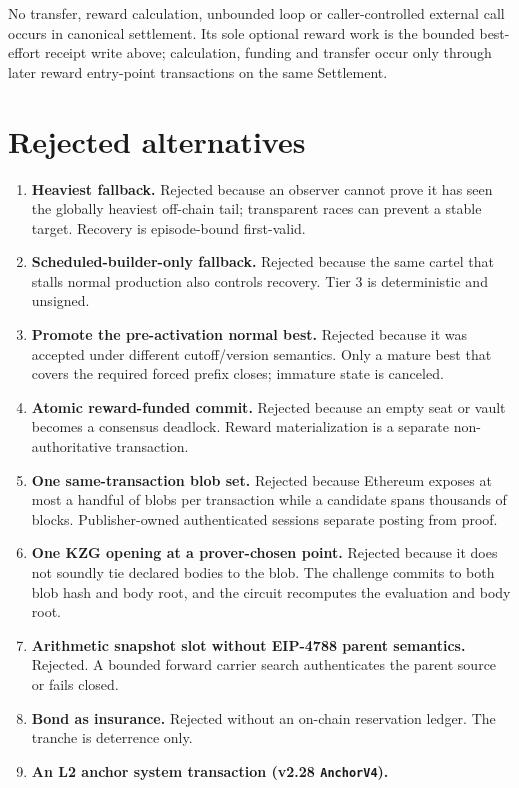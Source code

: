 \documentclass[a4paper,11pt]{article}
\newcommand{\code}[1]{\nolinkurl{#1}}
\begin{document}
No transfer, reward calculation, unbounded loop or caller-controlled external
call occurs in canonical settlement.  Its sole optional reward work is the
bounded best-effort receipt write above; calculation, funding and transfer occur
only through later reward entry-point transactions on the same Settlement.
\section{Rejected alternatives}\label{app:alternatives}

\begin{enumerate}
\item \textbf{Heaviest fallback.} Rejected because an observer cannot prove it
has seen the globally heaviest off-chain tail; transparent races can prevent a
stable target.  Recovery is episode-bound first-valid.
\item \textbf{Scheduled-builder-only fallback.} Rejected because the same cartel
that stalls normal production also controls recovery.  Tier 3 is deterministic
and unsigned.
\item \textbf{Promote the pre-activation normal best.} Rejected because it was
accepted under different cutoff/version semantics.  Only a mature best that
covers the required forced prefix closes; immature state is canceled.
\item \textbf{Atomic reward-funded commit.} Rejected because an empty seat or
vault becomes a consensus deadlock.  Reward materialization is a separate
non-authoritative transaction.
\item \textbf{One same-transaction blob set.} Rejected because Ethereum exposes
at most a handful of blobs per transaction while a candidate spans thousands of
blocks.  Publisher-owned authenticated sessions separate posting from proof.
\item \textbf{One KZG opening at a prover-chosen point.} Rejected because it does
not soundly tie declared bodies to the blob.  The challenge commits to both blob
hash and body root, and the circuit recomputes the evaluation and body root.
\item \textbf{Arithmetic snapshot slot without EIP-4788 parent semantics.}
Rejected.  A bounded forward carrier search authenticates the parent source or
fails closed.
\item \textbf{Bond as insurance.} Rejected without an on-chain reservation
ledger.  The tranche is deterrence only.
\item \textbf{An L2 anchor system transaction (v2.28 \code{AnchorV4}).}

\end{enumerate}
\end{document}
